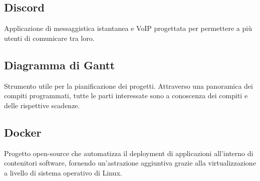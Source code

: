 \documentclass[../glossario.tex]{subfiles}
\begin{document}
\subsection*{Discord}
Applicazione di messaggistica istantanea e VoIP progettata per permettere a più utenti di comunicare tra loro.


\subsection*{Diagramma di Gantt}
Strumento utile per la pianificazione dei progetti. Attraverso una panoramica dei compiti programmati, tutte le parti interessate sono a conoscenza dei compiti e delle rispettive scadenze.

\subsection*{Docker}
Progetto open-source che automatizza il deployment di applicazioni all'interno di contenitori software, fornendo un'astrazione aggiuntiva grazie alla virtualizzazione a livello di sistema operativo di Linux.
\end{document}
